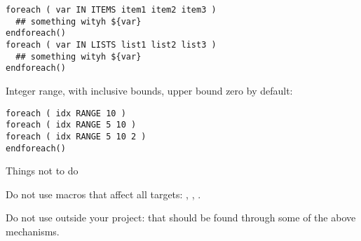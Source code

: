 \begin{lstlisting}
foreach ( var IN ITEMS item1 item2 item3 )
  ## something wityh ${var}
endforeach()
foreach ( var IN LISTS list1 list2 list3 )
  ## something wityh ${var}
endforeach()
\end{lstlisting}

Integer range, with inclusive bounds, upper bound zero by default:
\begin{lstlisting}
foreach ( idx RANGE 10 )
foreach ( idx RANGE 5 10 )
foreach ( idx RANGE 5 10 2 )
endforeach()
\end{lstlisting}

 {Things not to do}

Do not use macros that affect all targets: ,
, .

Do not use  outside your project:
that should be found through some of the above mechanisms.


